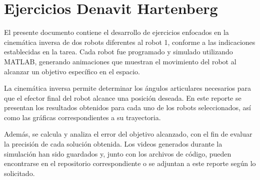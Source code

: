 \section{Ejercicios Denavit Hartenberg}

El presente documento contiene el desarrollo de ejercicios enfocados en la cinemática inversa de dos robots diferentes al robot 1, conforme a las indicaciones establecidas en la tarea. Cada robot fue programado y simulado utilizando MATLAB, generando animaciones que muestran el movimiento del robot al alcanzar un objetivo específico en el espacio.

La cinemática inversa permite determinar los ángulos articulares necesarios para que el efector final del robot alcance una posición deseada. En este reporte se presentan los resultados obtenidos para cada uno de los robots seleccionados, así como las gráficas correspondientes a su trayectoria.

Además, se calcula y analiza el error del objetivo alcanzado, con el fin de evaluar la precisión de cada solución obtenida. Los videos generados durante la simulación han sido guardados y, junto con los archivos de código, pueden encontrarse en el repositorio correspondiente o se adjuntan a este reporte según lo solicitado.